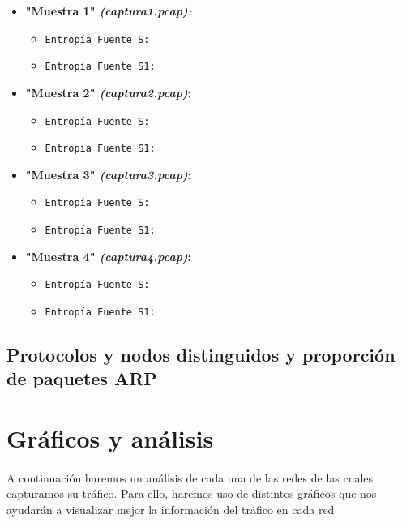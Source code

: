 \documentclass[11pt,a4paper]{article}
\begin{document}
	
	\begin{itemize}
 	 \item \textbf{"Muestra 1" \emph{(captura1.pcap):}}
			\begin{itemize}
				\item \texttt{Entropía Fuente S: }				
				\item \texttt{Entropía Fuente S{\scriptsize 1}: }
			\end{itemize}

 	 \item \textbf{"Muestra 2" \emph{(captura2.pcap)}:}
		   \begin{itemize}
				\item \texttt{Entropía Fuente S: }				
				\item \texttt{Entropía Fuente S{\scriptsize 1}: }
		   \end{itemize}
		   
 	 \item \textbf{"Muestra 3" \emph{(captura3.pcap)}:}
		 	 \begin{itemize}
		 	 	\item \texttt{Entropía Fuente S: }				
		 	 	\item \texttt{Entropía Fuente S{\scriptsize 1}: }
		 	 \end{itemize}
		   
	 \item \textbf{"Muestra 4" \emph{(captura4.pcap)}:}
		   \begin{itemize}
		   	\item \texttt{Entropía Fuente S: }				
		   	\item \texttt{Entropía Fuente S{\scriptsize 1}: }
		   \end{itemize}
		   		   		 	 		   
	\end{itemize}

\subsection{Protocolos y nodos distinguidos y proporción de paquetes ARP}
	

	
\newpage
\section{Gráficos y análisis}
\paragraph{}
A continuación haremos un análisis de cada una de las redes de las cuales capturamos su tráfico. Para ello, haremos uso de distintos gráficos que nos ayudarán a visualizar mejor la información del tráfico en cada red.
\end{document}
